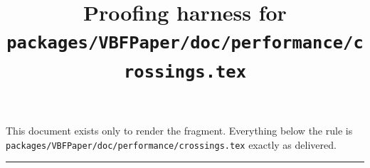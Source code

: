 \documentclass[10pt]{article}
\title{Proofing harness for \texttt{packages/VBFPaper/doc/performance/crossings.tex}}
\author{}
\date{}
\begin{document}
\maketitle

\noindent
This document exists only to render the fragment. Everything below the rule is
\verb|packages/VBFPaper/doc/performance/crossings.tex| exactly as delivered.

\hrule\vspace{1em}


\end{document}
